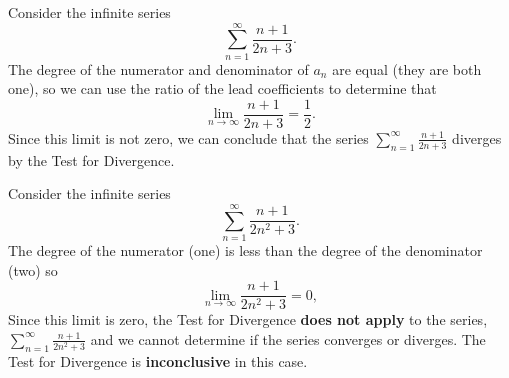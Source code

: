 \documentclass{ximera}
\begin{document}
\begin{example}
Consider the infinite series
\[
\sum_{n=1}^\infty \frac{n+1}{2n+3}.
\]
The degree of the numerator and denominator of $a_n$ are equal (they are both one), so we can use the ratio of the lead coefficients to determine that
\[
\lim_{n\to \infty} \frac{n+1}{2n+3} = \frac12.
\]
Since this limit is not zero, we can conclude that the series $\displaystyle{\sum_{n=1}^\infty \frac{n+1}{2n+3}}$ diverges by the Test for Divergence. 
\end{example}

\begin{example}
Consider the infinite series
\[
\sum_{n=1}^\infty \frac{n+1}{2n^2+3}.
\]
The degree of the numerator (one) is less than the degree of the denominator (two) so
\[
\lim_{n\to \infty} \frac{n+1}{2n^2+3} = 0,
\]
Since this limit is zero, the Test for Divergence \textbf{does not apply} to the series, $\displaystyle{\sum_{n=1}^\infty \frac{n+1}{2n^2+3}}$ and 
we cannot determine if the series converges or diverges. 
The Test for Divergence is \textbf{inconclusive} in this case.
 
\end{example}
\end{document}
